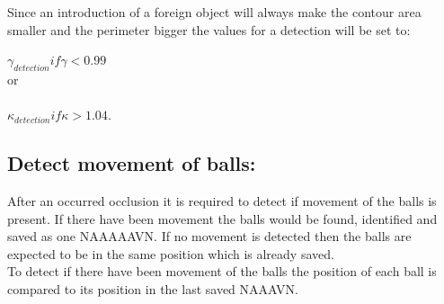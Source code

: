 Since an introduction of a foreign object will always make the contour area smaller and the perimeter bigger the values for a detection will be set to:

\begin{center}
$\gamma_{detection} if \gamma < 0.99$ \\
or\\\\
$\kappa_{detection} if \kappa > 1.04$.
\end{center}


\subsection{Detect movement of balls:}
After an occurred occlusion it is required to detect if movement of the balls is present. If there have been movement the balls would be found, identified and saved as one NAAAAAVN. If no movement is detected then the balls are expected to be in the same position which is already saved.\\

To detect if there have been movement of the balls the position of each ball is compared to its position in the last saved NAAAVN. 

